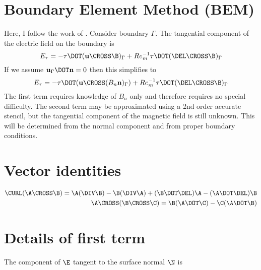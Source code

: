 \documentclass[11pt]{article}
\begin{document}
\doublespacing
\MOONSTITLE

\section{Boundary Element Method (BEM)}
Here, I follow the work of \cite{Iskakov2004}. Consider boundary $\Gamma$. The tangential component of the electric field on the boundary is
\begin{equation}
  E_{\tau} = -\mathbf{\tau} \DOT (\mathbf{u} \CROSS \B)_{\Gamma} +
  Re_m^{-1} \mathbf{\tau} \DOT (\DEL \CROSS \B)_{\Gamma}
\end{equation}
If we assume $\mathbf{u}_{\Gamma} \DOT \mathbf{n} = 0$ then this simplifies to
\begin{equation}
  E_{\tau} = -\mathbf{\tau} \DOT (\mathbf{u} \CROSS (B_n \mathbf{n})_{\Gamma}) +
  Re_m^{-1} \mathbf{\tau} \DOT (\DEL \CROSS \B)_{\Gamma}
\end{equation}
The first term requires knowledge of $B_n$ only and therefore requires no special difficulty. The second term may be approximated using a 2nd order accurate stencil, but the tangential component of the magnetic field is still unknown. This will be determined from the normal component and from proper boundary conditions.

\section{Vector identities}
\begin{equation}\begin{aligned}
  \CURL (\A \CROSS \B) = \A (\DIV \B) - \B (\DIV \A) + (\B \DOT \DEL)\A - (\A \DOT \DEL)\B \\
  \A \CROSS (\B \CROSS \C) = \B (\A \DOT \C) - \C (\A \DOT \B)
\end{aligned}\end{equation}

\section{Details of first term}
The component of $\E$ tangent to the surface normal $\N$ is
\end{document}
